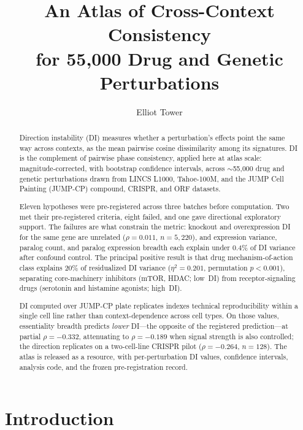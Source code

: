 \documentclass[11pt]{article}
\title{An Atlas of Cross-Context Consistency\\
for 55,000 Drug and Genetic Perturbations}
\author{Elliot Tower}
\affil{Independent researcher \\ \texttt{elliot@elliottower.ai}}
\date{}
\begin{document}
\maketitle

\begin{abstract}
Direction instability (DI) measures whether a perturbation's effects point the
same way across contexts, as the mean pairwise cosine dissimilarity among its
signatures.  DI is the complement of pairwise phase consistency, applied
here at atlas scale: magnitude-corrected, with
bootstrap confidence intervals, across ${\sim}$55{,}000 drug and genetic
perturbations drawn from LINCS L1000, Tahoe-100M, and the JUMP Cell Painting (JUMP-CP)
compound, CRISPR, and ORF datasets.

Eleven hypotheses were pre-registered across three batches before computation.
Two met their pre-registered criteria, eight failed, and one gave directional
exploratory support. The failures are what constrain the metric:
knockout and overexpression DI for the same gene are unrelated
($\rho = 0.011$, $n = 5{,}220$), and expression variance, paralog count, and
paralog expression breadth each explain under 0.4\% of DI variance after
confound control.  The principal positive result is that drug
mechanism-of-action class explains 20\% of residualized DI variance
($\eta^2 = 0.201$, permutation $p < 0.001$), separating core-machinery
inhibitors (mTOR, HDAC; low~DI) from receptor-signaling drugs (serotonin and
histamine agonists; high~DI).

DI computed over JUMP-CP plate replicates indexes technical reproducibility
within a single cell line rather than context-dependence across cell types.
On those values, essentiality breadth predicts \emph{lower} DI---the opposite
of the registered prediction---at partial $\rho = -0.332$, attenuating to
$\rho = -0.189$ when signal strength is also controlled; the direction
replicates on a two-cell-line CRISPR pilot ($\rho = -0.264$, $n = 128$).  The
atlas is released as a resource, with per-perturbation DI values, confidence
intervals, analysis code, and the frozen pre-registration record.
\end{abstract}


\section{Introduction}
\end{document}
